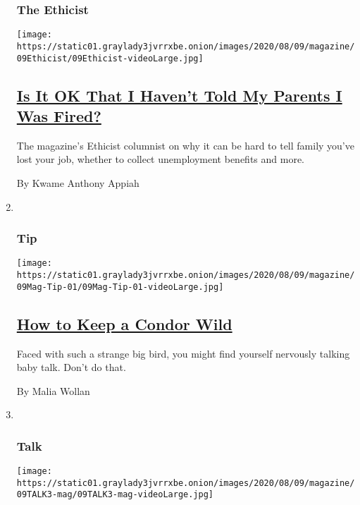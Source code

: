 \begin{enumerate}
{  \subsubsection{The Ethicist}\label{the-ethicist}}

  \texttt{[image: https://static01.graylady3jvrrxbe.onion/images/2020/08/09/magazine/09Ethicist/09Ethicist-videoLarge.jpg]}

  \hypertarget{is-it-ok-that-i-havent-told-my-parents-i-was-fired}{%
  \subsection{\texorpdfstring{\href{/2020/08/04/magazine/jobs-unemployment-ethics.html}{Is
  It OK That I Haven't Told My Parents I Was
  Fired?}}{Is It OK That I Haven't Told My Parents I Was Fired?}}\label{is-it-ok-that-i-havent-told-my-parents-i-was-fired}}

  The magazine's Ethicist columnist on why it can be hard to tell family
  you've lost your job, whether to collect unemployment benefits and
  more.

  By Kwame Anthony Appiah
\item ~
  \hypertarget{tip}{%
  \subsubsection{Tip}\label{tip}}

  \texttt{[image: https://static01.graylady3jvrrxbe.onion/images/2020/08/09/magazine/09Mag-Tip-01/09Mag-Tip-01-videoLarge.jpg]}

  \hypertarget{how-to-keep-a-condor-wild}{%
  \subsection{\texorpdfstring{\href{/2020/08/04/magazine/condors-yurok-tribe.html}{How
  to Keep a Condor
  Wild}}{How to Keep a Condor Wild}}\label{how-to-keep-a-condor-wild}}

  Faced with such a strange big bird, you might find yourself nervously
  talking baby talk. Don't do that.

  By Malia Wollan
\item ~
  \hypertarget{talk}{%
  \subsubsection{Talk}\label{talk}}

  \texttt{[image: https://static01.graylady3jvrrxbe.onion/images/2020/08/09/magazine/09TALK3-mag/09TALK3-mag-videoLarge.jpg]}


\end{enumerate}
